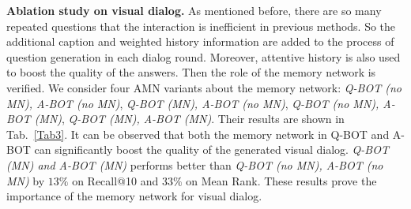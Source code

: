 \documentclass[review]{elsarticle}
\begin{document}
	\textbf{Ablation study on visual dialog.} As mentioned before, there are so many repeated questions that the interaction is inefficient in previous methods. 
	So the additional caption and weighted history information are added to the process of question generation in each dialog round. Moreover, attentive history is also used to boost the quality of the answers.
	Then the role of the memory network is verified.
	We consider four AMN variants about the memory network: \emph{Q-BOT (no MN), A-BOT (no MN)}, \emph{Q-BOT (MN), A-BOT (no MN)}, \emph{Q-BOT (no MN), A-BOT (MN)}, \emph{Q-BOT (MN), A-BOT (MN)}. 
	Their results are shown in Tab.~\ref{Tab3}. It can be observed that both the memory network in Q-BOT and A-BOT can significantly boost the quality of the generated visual dialog. 
	\emph{Q-BOT (MN) and A-BOT (MN)} performs better than \emph{Q-BOT (no MN), A-BOT (no MN)} by $13\%$ on Recall@10 and $33\%$ on Mean Rank. 
	These results prove the importance of the memory network for visual dialog. 
	
\end{document}
